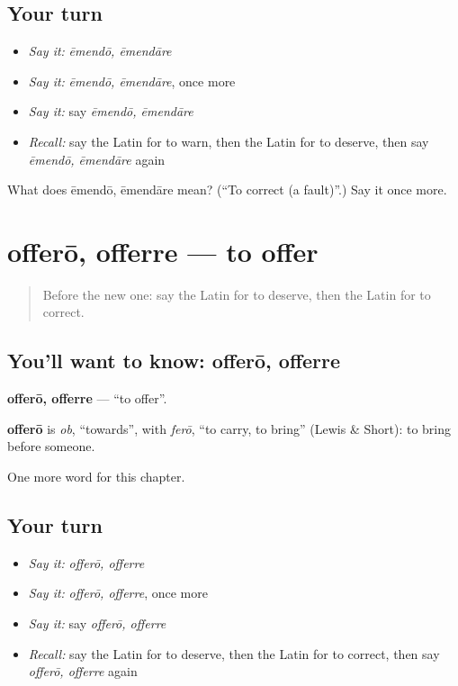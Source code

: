 \subsection*{Your turn}
\begin{itemize}
\raggedright
  \item \emph{Say it:} \emph{ēmendō, ēmendāre}
  \item \emph{Say it:} \emph{ēmendō, ēmendāre}, once more
  \item \emph{Say it:} say \emph{ēmendō, ēmendāre}
  \item \emph{Recall:} say the Latin for to warn, then the Latin for to deserve, then say \emph{ēmendō, ēmendāre} again
\end{itemize}

\begin{tcolorbox}[breakable,colback=teal!4,colframe=teal!35!black,title={Before you move on}]
What does ēmendō, ēmendāre mean? (\textquotedblleft{}To correct (a fault)\textquotedblright{}.) Say it once more.
\end{tcolorbox}
\section[offerō, offerre]{offerō, offerre — to offer}

\label{lesson:LA-C257-offero}



\begin{quote}
Before the new one: say the Latin for to deserve, then the Latin for to correct.
\end{quote}

\subsection*{You'll want to know: offerō, offerre}
\textbf{offerō, offerre} — \textquotedblleft{}to offer\textquotedblright{}.

\begin{cousinweb}
\textbf{offerō} is \emph{ob}, \textquotedblleft{}towards\textquotedblright{}, with \emph{ferō}, \textquotedblleft{}to carry, to bring\textquotedblright{} (Lewis \& Short): to bring before someone.
\end{cousinweb}

\begin{grammarlens}[title={What you've built}]
One more word for this chapter.
\end{grammarlens}

\subsection*{Your turn}
\begin{itemize}
\raggedright
  \item \emph{Say it:} \emph{offerō, offerre}
  \item \emph{Say it:} \emph{offerō, offerre}, once more
  \item \emph{Say it:} say \emph{offerō, offerre}
  \item \emph{Recall:} say the Latin for to deserve, then the Latin for to correct, then say \emph{offerō, offerre} again
\end{itemize}

